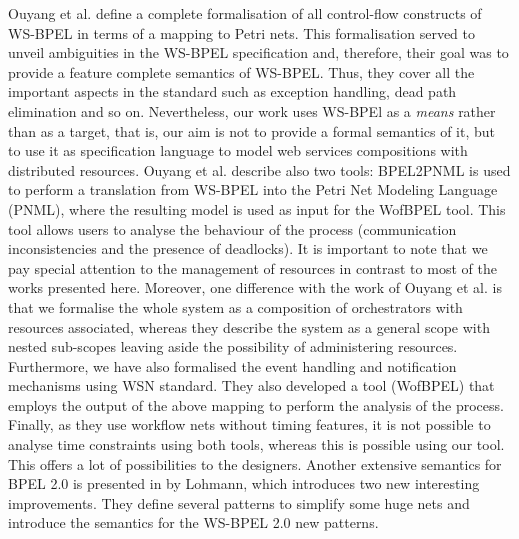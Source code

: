 Ouyang et al. \cite{Ouyang2007} define a complete formalisation of all control-flow constructs of WS-BPEL in terms of a mapping to Petri nets.
This formalisation served to unveil ambiguities in the WS-BPEL specification and, therefore, their goal was to provide a feature complete semantics of WS-BPEL.
Thus, they cover all the important aspects in the standard such as exception handling, dead path elimination and so on. Nevertheless, our work uses WS-BPEl as a \emph{means} rather than as a target, that is, our aim is not to provide a formal semantics of it, but to use it as specification language to model web services compositions with distributed resources. 
Ouyang et al. describe also two tools: BPEL2PNML is used to perform a
translation from WS-BPEL into the Petri Net Modeling Language (PNML), where the
resulting model is used as input for the WofBPEL tool. This tool allows users to analyse the behaviour of the process (communication inconsistencies and the presence of deadlocks). It is important to note that we pay special attention to the management of resources in contrast to most of the works presented here. Moreover, one difference with the work of Ouyang et al. is that we formalise the whole
system as a composition of orchestrators with resources associated, whereas they describe the system as a general scope with nested sub-scopes leaving aside the possibility of administering resources. Furthermore, we have also formalised the event handling and notification mechanisms using WSN standard. 
They also developed a tool (WofBPEL) that employs the output of the above mapping to perform  the analysis of the process. Finally, as they use workflow nets without timing features, it is not possible to analyse time constraints using both tools, whereas this is possible using our tool. This offers a lot of possibilities to the designers. 
Another extensive semantics for BPEL 2.0
is presented in \cite{Lohmann07} by Lohmann, which introduces two new interesting improvements. They define several patterns to simplify some huge nets and introduce the semantics for the WS-BPEL 2.0 new patterns.

